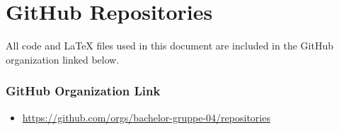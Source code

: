 \chapter{GitHub Repositories}
\label{app:github-repositories}

All code and LaTeX files used in this document are included in the GitHub organization linked below.

\subsection*{GitHub Organization Link}

\begin{itemize}
    \item \url{https://github.com/orgs/bachelor-gruppe-04/repositories}
\end{itemize}